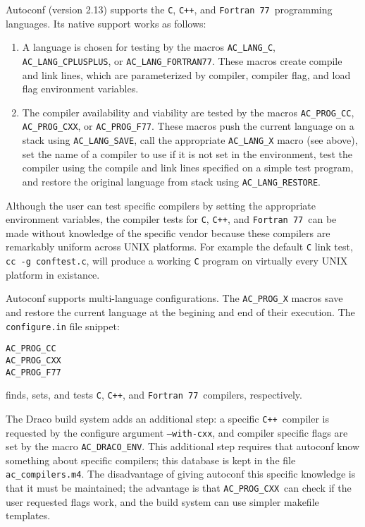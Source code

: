 \documentclass[11pt]{nmemo}
\newcommand{\cpp}{\texttt{C++}}
\newcommand{\fseventyseven}{\texttt{Fortran 77}}
\newcommand{\langc}{\texttt{AC\_LANG\_C}}
\newcommand{\langcplusplus}{\texttt{AC\_LANG\_CPLUSPLUS}}
\newcommand{\langfseventyseven}{\texttt{AC\_LANG\_FORTRAN77}}
\newcommand{\progcc}{\texttt{AC\_PROG\_CC}}
\newcommand{\progcxx}{\texttt{AC\_PROG\_CXX}}
\newcommand{\progfseventyseven}{\texttt{AC\_PROG\_F77}}
\newcommand{\langsave}{\texttt{AC\_LANG\_SAVE}}
\newcommand{\langrestore}{\texttt{AC\_LANG\_RESTORE}}
\begin{document}
Autoconf (version 2.13) supports the \texttt{C}, \cpp, and
\fseventyseven\ programming languages.  Its native support works as
follows:
\begin{enumerate} 
\item A language is chosen for testing by the macros \langc,
\langcplusplus, or \langfseventyseven.  These macros create compile
and link lines, which are parameterized by compiler, compiler flag,
and load flag environment variables.
\item The compiler availability and viability are tested by the macros
\progcc, \progcxx, or \progfseventyseven.  These macros push the
current language on a stack using \langsave, call the appropriate
\texttt{AC\_LANG\_X} macro (see above), set the name of a compiler to
use if it is not set in the environment, test the compiler using the
compile and link lines specified on a simple test program, and restore
the original language from stack using \langrestore.
\end{enumerate}
Although the user can test specific compilers by setting the
appropriate environment variables, the compiler tests for \texttt{C},
\cpp, and \fseventyseven\ can be made without knowledge of the
specific vendor because these compilers are remarkably uniform across
UNIX platforms.  For example the default \texttt{C} link test,
\texttt{cc -g conftest.c}, will produce a working \texttt{C} program
on virtually every UNIX platform in existance.

Autoconf supports multi-language configurations.  The
\texttt{AC\_PROG\_X} macros save and restore the current language at
the begining and end of their execution.  The \texttt{configure.in}
file snippet:
\begin{verbatim}
AC_PROG_CC
AC_PROG_CXX
AC_PROG_F77
\end{verbatim}
finds, sets, and tests \texttt{C}, \cpp, and \fseventyseven\ compilers,
respectively.

The Draco build system adds an additional step: a specific \cpp\
compiler is requested by the configure argument \texttt{--with-cxx},
and compiler specific flags are set by the macro
\texttt{AC\_DRACO\_ENV}.  This additional step requires that autoconf
know something about specific compilers; this database is kept in the
file \texttt{ac\_compilers.m4}.  The disadvantage of giving autoconf
this specific knowledge is that it must be maintained; the advantage
is that \progcxx\ can check if the user requested flags
work, and the build system can use simpler makefile templates.
\end{document}
